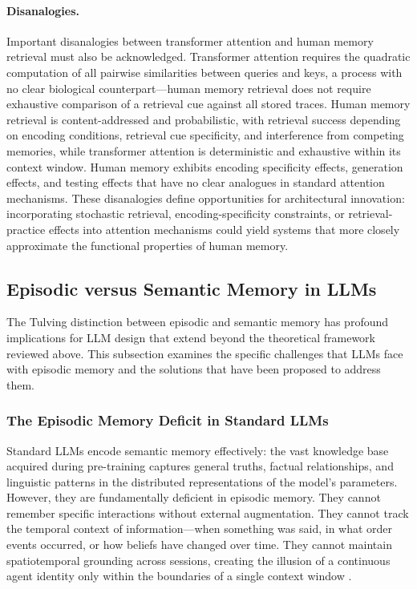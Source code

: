 \documentclass[11pt,letterpaper]{article}
\begin{document}
\paragraph{Disanalogies.} Important disanalogies between transformer attention and human memory retrieval must also be acknowledged. Transformer attention requires the quadratic computation of all pairwise similarities between queries and keys, a process with no clear biological counterpart---human memory retrieval does not require exhaustive comparison of a retrieval cue against all stored traces. Human memory retrieval is content-addressed and probabilistic, with retrieval success depending on encoding conditions, retrieval cue specificity, and interference from competing memories, while transformer attention is deterministic and exhaustive within its context window. Human memory exhibits encoding specificity effects, generation effects, and testing effects that have no clear analogues in standard attention mechanisms. These disanalogies define opportunities for architectural innovation: incorporating stochastic retrieval, encoding-specificity constraints, or retrieval-practice effects into attention mechanisms could yield systems that more closely approximate the functional properties of human memory.

\subsection{Episodic versus Semantic Memory in LLMs}

The Tulving distinction between episodic and semantic memory \cite{tulving1972episodic, tulving1985memory} has profound implications for LLM design that extend beyond the theoretical framework reviewed above. This subsection examines the specific challenges that LLMs face with episodic memory and the solutions that have been proposed to address them.

\subsubsection{The Episodic Memory Deficit in Standard LLMs}

Standard LLMs encode semantic memory effectively: the vast knowledge base acquired during pre-training captures general truths, factual relationships, and linguistic patterns in the distributed representations of the model's parameters. However, they are fundamentally deficient in episodic memory. They cannot remember specific interactions without external augmentation. They cannot track the temporal context of information---when something was said, in what order events occurred, or how beliefs have changed over time. They cannot maintain spatiotemporal grounding across sessions, creating the illusion of a continuous agent identity only within the boundaries of a single context window \cite{ning2025episodic, sun2025episodic}.
\end{document}
